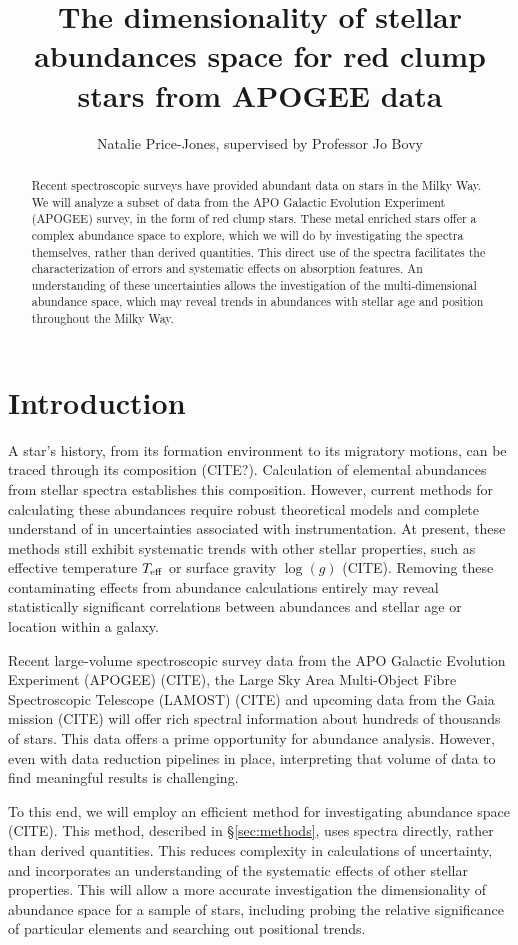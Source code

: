 \documentclass[preprint]{aastex}
\begin{document}
\title{The dimensionality of stellar abundances space for red clump stars from APOGEE data}
\author{Natalie Price-Jones, supervised by Professor Jo Bovy}

\begin{abstract}
Recent spectroscopic surveys have provided abundant data on stars in the Milky Way. We will analyze a subset of data from the APO Galactic Evolution Experiment (APOGEE) survey, in the form of red clump stars. These metal enriched stars offer a complex abundance space to explore, which we will do by investigating the spectra themselves, rather than derived quantities. This direct use of the spectra facilitates the characterization of errors and systematic effects on absorption features. An understanding of these uncertainties allows the investigation of the multi-dimensional abundance space, which may reveal trends in abundances with stellar age and position throughout the Milky Way.

\end{abstract}

\section{Introduction}
\label{sec:back}
A star's history, from its formation environment to its migratory motions, can be traced through its composition (CITE?). Calculation of elemental abundances from stellar spectra establishes this composition. However, current methods for calculating these abundances require robust theoretical models and complete understand of in uncertainties associated with instrumentation. At present, these methods still exhibit systematic trends with other stellar properties, such as effective temperature $T_{\rm eff}$ or surface gravity $\log(g)$ (CITE). Removing these contaminating effects from abundance calculations entirely may reveal statistically significant correlations between abundances and stellar age or location within a galaxy. 

Recent large-volume spectroscopic survey data from the APO Galactic Evolution Experiment (APOGEE) (CITE), the Large Sky Area Multi-Object Fibre Spectroscopic Telescope (LAMOST) (CITE) and upcoming data from the Gaia mission (CITE) will offer rich spectral information about hundreds of thousands of stars. This data offers a prime opportunity for abundance analysis. However, even with data reduction pipelines in place, interpreting that volume of data to find meaningful results is challenging. 

To this end, we will employ an efficient method for investigating abundance space (CITE). This method, described in \S\ref{sec:methods}, uses spectra directly, rather than derived quantities. This reduces complexity in calculations of uncertainty, and incorporates an understanding of the systematic effects of other stellar properties. This will allow a more accurate investigation the dimensionality of abundance space for a sample of stars, including probing the relative significance of particular elements and searching out positional trends.
\end{document}
